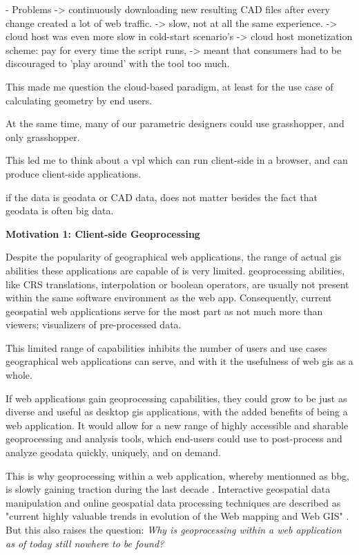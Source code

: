   - Problems
    -> continuously downloading new resulting CAD files after every change created a lot of web traffic. 
    -> slow, not at all the same experience.
    -> cloud host was even more slow in cold-start scenario's   
    -> cloud host monetization scheme: pay for every time the script runs, 
       -> meant that consumers had to be discouraged to 'play around' with the tool too much. 
    
  This made me question the cloud-based paradigm, at least for the use case of calculating geometry by end users. 
  
  At the same time, many of our parametric designers could use grasshopper, and only grasshopper. 
  
  This led me to think about a vpl which can run client-side in a browser, and can produce client-side applications.
  
  if the data is geodata or CAD data, does not matter besides the fact that geodata is often big data.
  
  \textbf{Motivation 1: Client-side Geoprocessing}
  
  Despite the popularity of geographical web applications, the range of actual \ac{gis} abilities these applications are capable of is very limited. \ac{geoprocessing} abilities, like CRS translations, interpolation or boolean operators, are usually not present within the same software environment as the web app. Consequently, current geospatial web applications serve for the most part as not much more than viewers; visualizers of pre-processed data. 
  
  This limited range of capabilities inhibits the number of users and use cases geographical web applications can serve, and with it the usefulness of web \ac{gis} as a whole. 
  
  If web applications gain \ac{geoprocessing} capabilities, they could grow to be just as diverse and useful as desktop \ac{gis} applications, with the added benefits of being a web application. It would allow for a new range of highly accessible and sharable geoprocessing and analysis tools, which end-users could use to post-process and analyze geodata quickly, uniquely, and on demand.
  
  This is why \ac{geoprocessing} within a web application, whereby mentionned as \ac{bbg}, is slowly gaining traction during the last decade \cite{kulawiak_analysis_2019, panidi_hybrid_2015, hamilton_client-side_2014}. Interactive geospatial data manipulation and online geospatial data processing techniques are described as "current highly valuable trends in evolution of the Web mapping and Web GIS" \cite{panidi_hybrid_2015}. But this also raises the question: \textit{Why is geoprocessing within a web application as of today still nowhere to be found?} 
  
